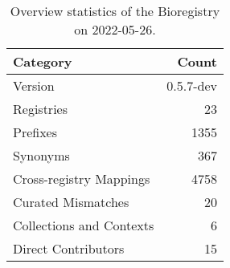 \begin{table}
\centering
\caption{Overview statistics of the Bioregistry on 2022-05-26.}
\label{tab:bioregistry-summary}
\begin{tabular}{lr}
\toprule
                Category &     Count \\
\midrule
                 Version & 0.5.7-dev \\
              Registries &        23 \\
                Prefixes &      1355 \\
                Synonyms &       367 \\
 Cross-registry Mappings &      4758 \\
      Curated Mismatches &        20 \\
Collections and Contexts &         6 \\
     Direct Contributors &        15 \\
\bottomrule
\end{tabular}
\end{table}

